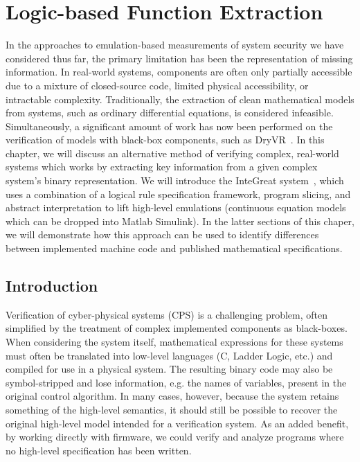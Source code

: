 \chapter{Logic-based Function Extraction}
\label{chap:integreat}

In the approaches to emulation-based measurements of system security we have considered thus far, the primary limitation has been the representation of missing information.
In real-world systems, components are often only partially accessible due to a mixture of closed-source code, limited physical accessibility, or intractable complexity.
Traditionally, the extraction of clean mathematical models from systems, such as ordinary differential equations, is considered infeasible.
Simultaneously, a significant amount of work has now been performed on the verification of models with black-box components, such as DryVR~\cite{fan2017dryvr}.
In this chapter, we will discuss an alternative method of verifying complex, real-world systems which works by extracting key information from a given complex system's binary representation.
We will introduce the InteGreat system~\cite{bland2023integreat}, which uses a combination of a logical rule specification framework, program slicing, and abstract interpretation to lift high-level emulations (continuous equation models which can be dropped into Matlab Simulink).
In the latter sections of this chaper, we will demonstrate how this approach can be used to identify differences between implemented machine code and published mathematical specifications.

\section{Introduction}

Verification of cyber-physical systems (CPS) is a challenging problem, often simplified by the treatment of complex implemented components as black-boxes.
When considering the system itself, mathematical expressions for these systems must often be translated into low-level languages (C, Ladder Logic, etc.) and compiled for use in a physical system.
The resulting binary code may also be symbol-stripped and lose information, e.g. the names of variables, present in the original control algorithm.
In many cases, however, because the system retains something of the high-level semantics, it should still be possible to recover the original high-level model intended for a verification system.
As an added benefit, by working directly with firmware, we could verify and analyze programs where no high-level specification has been written.

